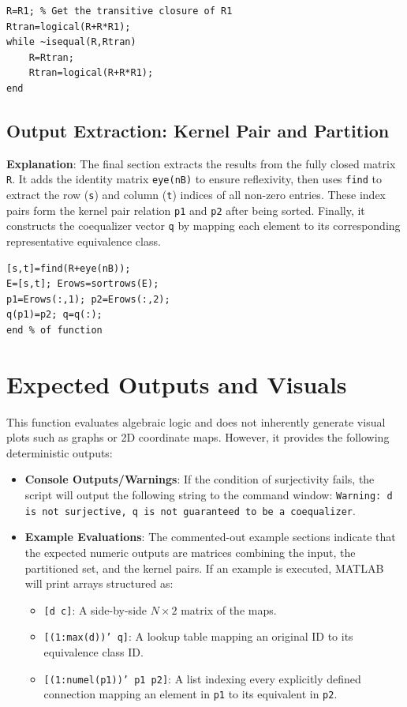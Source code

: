 \begin{lstlisting}[caption={Transitive Closure Computation}]
R=R1; % Get the transitive closure of R1
Rtran=logical(R+R*R1);
while ~isequal(R,Rtran)
    R=Rtran;
    Rtran=logical(R+R*R1);
end
\end{lstlisting}

\subsection{Output Extraction: Kernel Pair and Partition}
\textbf{Explanation}: The final section extracts the results from the fully closed matrix \texttt{R}. It adds the identity matrix \texttt{eye(nB)} to ensure reflexivity, then uses \texttt{find} to extract the row (\texttt{s}) and column (\texttt{t}) indices of all non-zero entries. These index pairs form the kernel pair relation \texttt{p1} and \texttt{p2} after being sorted. Finally, it constructs the coequalizer vector \texttt{q} by mapping each element to its corresponding representative equivalence class.

\begin{lstlisting}[caption={Output Extraction}]
[s,t]=find(R+eye(nB));
E=[s,t]; Erows=sortrows(E);
p1=Erows(:,1); p2=Erows(:,2);
q(p1)=p2; q=q(:);
end % of function
\end{lstlisting}

\section{Expected Outputs and Visuals}

This function evaluates algebraic logic and does not inherently generate visual plots such as graphs or 2D coordinate maps. However, it provides the following deterministic outputs:

\begin{itemize}
    \item \textbf{Console Outputs/Warnings}: If the condition of surjectivity fails, the script will output the following string to the command window: \texttt{Warning: d is not surjective, q is not guaranteed to be a coequalizer}.
    \item \textbf{Example Evaluations}: The commented-out example sections indicate that the expected numeric outputs are matrices combining the input, the partitioned set, and the kernel pairs. If an example is executed, MATLAB will print arrays structured as:
    \begin{itemize}
        \item \texttt{[d c]}: A side-by-side $N \times 2$ matrix of the maps.
        \item \texttt{[(1:max(d))' q]}: A lookup table mapping an original ID to its equivalence class ID.
        \item \texttt{[(1:numel(p1))' p1 p2]}: A list indexing every explicitly defined connection mapping an element in \texttt{p1} to its equivalent in \texttt{p2}.
    \end{itemize}
\end{itemize}
